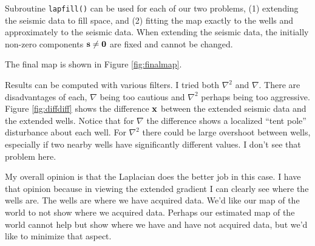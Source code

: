 
\par
Subroutine \texttt{lapfill()}
can be used for each of our two problems,
(1) extending the seismic data to fill space, and
(2) fitting the map exactly to the wells and approximately to the seismic data.
When extending the seismic data,
the initially non-zero components $\bold s \ne \bold 0$ are fixed
and cannot be changed.
\begin{comment}
That is done by calling
\texttt{lapfill()} with \texttt{mfixed=(s/=0.)}.
When extending wells,
the initially non-zero components $\bold w \ne \bold 0$ are fixed
and cannot be changed.
That is done by calling
\texttt{lapfill()} with \texttt{mfixed=(w/=0.)}.
\end{comment}

\par
The final map is shown in Figure \ref{fig:finalmap}.

\par
Results can be computed with various filters.
I tried both $\nabla^2$ and $\nabla$.
There are disadvantages of each,
$\nabla$ being too cautious and
$\nabla^2$ perhaps being too aggressive.
Figure \ref{fig:diffdiff} shows the difference $\bold x$ between
the extended seismic data and the extended wells.
Notice that for $\nabla$ the difference shows
a localized ``tent pole'' disturbance about each well.
For $\nabla^2$ there could be large overshoot between wells,
especially if two nearby wells have significantly different values.
I don't see that problem here.
\par
My overall opinion is that the Laplacian does the better job in this case.
I have that opinion because in viewing the extended gradient
I can clearly see where the wells are.
The wells are where we have acquired data.
We'd like our map of the world to not show where we acquired data.
Perhaps our estimated map of the world cannot help but show where
we have and have not acquired data, but we'd like to minimize that aspect.
\par
{}



